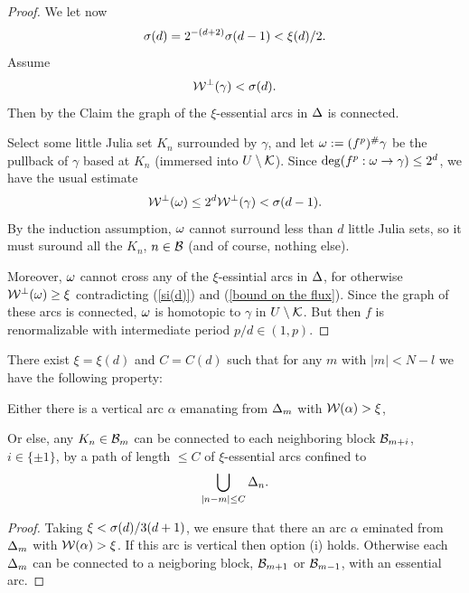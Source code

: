 {\begin{proof}
\msk  

We let now 
\begin{equation}\label{si(d)}
  {\sigma}(d) =  2^{-(d+2)}{\sigma}(d-1) < \xi(d)/2. 
\end{equation}
Assume 
\begin{equation}\label{bound on the flux}
   {\mathcal W}^\perp(\gamma)< {\sigma} (d). 
\end{equation}
Then by the Claim the graph of the $\xi$-essential arcs in ${\Delta}$ is connected. 

Select some little Julia set $K_n$ surrounded by $\gamma$, 
and let ${\omega} := (f^p)^\# \gamma$  be the pullback of $\gamma$ based at $K_n$ (immersed into $U\setminus {\mathcal K}$).    
Since $\deg(f^p: {\omega}\rightarrow \gamma) \leq 2^d$, we have  the usual estimate
$$
    {\mathcal W}^\perp({\omega}) \leq 2^d {\mathcal W}^\perp(\gamma) < {\sigma} (d-1).
$$
By the induction assumption, ${\omega}$ cannot surround less than  $d$ little Julia sets, 
so it must suround all the $K_n$, $n\in {\mathcal B}$ (and of course, nothing else). 

Moreover, ${\omega}$ cannot cross any of the $\xi$-essintial arcs in ${\Delta}$, for otherwise
${\mathcal W}^\perp({\omega}) \geq \xi$ contradicting (\ref{si(d)}) and (\ref{bound on the flux}). 
Since the graph of these arcs is connected,
${\omega}$ is homotopic to $\gamma$ in  $U\setminus {\mathcal K}$. But then $f$ is renormalizable with intermediate period
$p/d \in (1,  p) $.  
\end{proof}


\begin{lem}\label{ess chains}
There exist $\xi= \xi(d)$ and  $C=C(d)$ such that for any $m$ with $|m|< N-l $ we have the following property:

\ssk {} Either there is a vertical arc $\alpha$ emanating from ${\Delta}_m$  with ${\mathcal W}(\alpha)> \xi$, 

\ssk {} Or else,   any $K_n \in {\mathcal B}_m$  can be connected to 
each  neighboring block ${\mathcal B}_{m+i}$, $i\in \{\pm 1\}$,
by a path of length $\leq C$ of $\xi$-essential arcs confined to 
$$
         \bigcup_{ |n-m|\leq C} {\Delta}_n. 
$$  
\end{lem}

\begin{proof}
Taking $\xi < {\sigma}(d)/3(d+1) $, we ensure that there an arc $\alpha$ eminated from ${\Delta}_m$ with ${\mathcal W}(\alpha)> \xi$. 
If this arc is vertical then option (i) holds. Otherwise each ${\Delta}_m$ can be connected to a neigboring block, 
${\mathcal B}_{m+1}$ or ${\mathcal B}_{m-1}$, with an essential arc.   %


\end{proof}}

